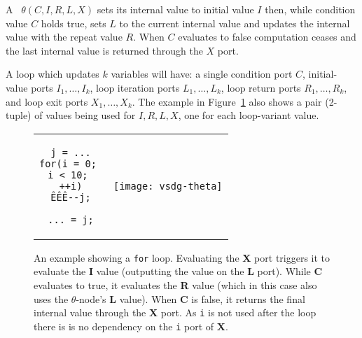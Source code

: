 A \Tn\ $\theta(C,I,R,L,X)$ sets its internal value to initial value $I$ then, while condition value $C$ holds true, sets $L$ to the current internal value and updates the internal value with the repeat value $R$. 
When $C$ evaluates to false computation ceases and the last internal value is returned through the $X$ port.

%
A loop which updates $k$ variables will have: 
a single condition port $C$, initial-value ports $I_1,\ldots,I_k$, loop iteration ports $L_1,\ldots,L_k$, loop return ports $R_1,\ldots,R_k$, and loop exit ports $X_1,\ldots,X_k$. 
The example in Figure~\ref{fig:thetatuple} also shows a pair (2-tuple) of values being used for $I,R,L,X$, one for each loop-variant value.


\begin{figure}[!ht]
\centering
\begin{tabular}{cc} \cline{1-1}
\begin{minipage}[c][\height][t]{0.9in}
\begin{verbatim}
j = ...
for(i = 0; 
i < 10; 
++i)
ÊÊÊ--j;
	
... = j;
\end{verbatim}
\end{minipage}
&
\begin{minipage}[c][\height][b]{3.0in}
\texttt{[image: vsdg-theta]}
\end{minipage} \\ \cline{1-1}
\end{tabular}

\caption{An example showing a \texttt{for} loop. 
  Evaluating the \textbf{X} port triggers it to evaluate the \textbf{I} value (outputting the value on the \textbf{L} port). 
  While \textbf{C} evaluates to true, it evaluates the \textbf{R} value (which in this case also uses the $\theta$-node's \textbf{L} value). 
  When \textbf{C} is false, it returns the final internal value through the \textbf{X} port. 
  As \texttt{i} is not used after the loop there is is no dependency on the \texttt{i} port of \textbf{X}.}
\label{fig:thetatuple}
\end{figure}

